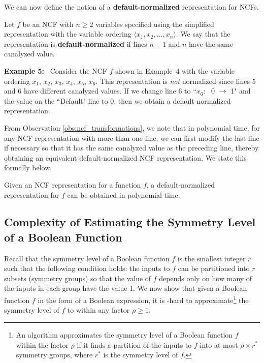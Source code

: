 
\medskip
We can now define the notion of a \textbf{default-normalized} 
representation for NCFs.

\begin{definition}
\label{def:normalized}
Let $f$ be an NCF with $n \geq 2$ variables specified using
the simplified representation with 
the variable ordering $\langle x_1, x_2, \ldots, x_n\rangle$.
We say that the representation is {\bf default-normalized} if
lines $n-1$ and $n$ have the same canalyzed value.
\end{definition}

\noindent
\textbf{Example 5:}~ 
Consider the NCF $f$ shown in Example~4 with
the variable ordering $x_1$, $x_2$, $x_3$, $x_4$, $x_5$, $x_6$.
This representation is \emph{not} normalized since lines 5 and 6
have different canalyzed values.
If we change line 6 to ``$x_6$:~ 0 $\longrightarrow$ 1" and the
value on the ``Default" line to 0, then we obtain 
a default-normalized representation. 

\medskip
From Observation \ref{obs:ncf_transformations},
we note that in polynomial time, for any NCF representation with more than one line,
we can first modify the last line if necessary 
so that it has the same canalyzed value as the preceding line,
thereby obtaining an equivalent default-normalized NCF representation.
We state this formally below.

\begin{observation}\label{obs:normalization_poly}
Given an NCF representation for a function $f$, a default-normalized
representation for $f$ can be obtained in polynomial time. \QED
\end{observation}

\subsection{Complexity of Estimating the Symmetry Level of a 
Boolean Function}
\label{sse:symmetry_level_hardness}

Recall that the symmetry level of a Boolean function $f$ is the smallest
integer $r$ such that the following condition holds:
the  inputs to $f$ can be partitioned into $r$ subsets 
(symmetry groups) so that the value of $f$ depends only on 
how many of the inputs in each group have the value 1.
We now show that given a Boolean function $f$
in the form of a Boolean expression, it is \cnp-hard to 
approximate\footnote{An algorithm approximates the symmetry
level of a Boolean function $f$ within the factor $\rho$ if it finds a
partition of the inputs to $f$ into at most $\rho \times r^*$ symmetry
groups, where $r^*$ is the symmetry level of $f$.}
the symmetry level of $f$ to within any factor $\rho \geq 1$.

